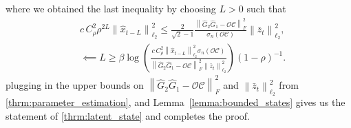 \documentclass[11pt]{article}
\newcommand{\zbar}{\bar{z}}
\newcommand{\xtil}{\hat{x}}
\newcommand{\Ccal}{\mathcal{C}}
\newcommand{\Ocal}{\mathcal{O}}
\newcommand{\tn}[1]{\left\|{#1}\right\|_{\ell_2}}
\newcommand{\nn}{\nonumber}
\newcommand{\fronorm}[1]{\left\|#1\right\|_{F}}
\newcommand{\<}{\langle}
\renewcommand{\>}{\rangle}
\numberwithin{equation}{section}
\begin{document}
where we obtained the last inequality by choosing $L >0$ such that
\begin{align*}
	& c\,C_{\rho}^2 \rho^{2L}\tn{\xtil_{t-L}}^2 \leq \frac{2}{\sqrt{2} - 1} \frac{\fronorm{\hat{G}_2 \hat{G}_1 - \Ocal \Ccal}^2}{\sigma_{n}\left(\Ocal \Ccal\right)}\tn{\zbar_t}^2, \nn \\
	&\impliedby L  \geq \beta\log \left(\frac{c\,C_{\rho}^2\tn{\xtil_{t-L}}^2 \sigma_{n}\left(\Ocal \Ccal\right)}{\fronorm{\hat{G}_2 \hat{G}_1 - \Ocal \Ccal}^2\tn{\zbar_t}^2}\right)(1-\rho)^{-1}.
\end{align*}
plugging in the upper bounds on $\fronorm{\hat{G}_2 \hat{G}_1 - \Ocal \Ccal}^2$ and $\tn{\zbar_t}^2$ from \ref{thrm:parameter_estimation}, and Lemma~\ref{lemma:bounded_states} gives us the statement of \ref{thrm:latent_state} and completes the proof. 
\end{document}
